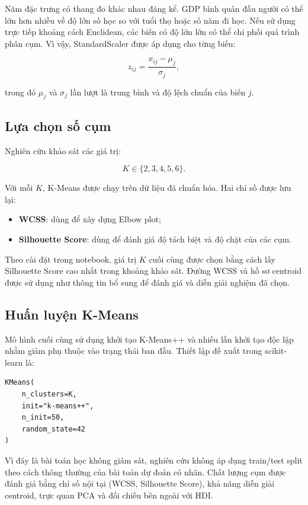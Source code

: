 \documentclass[11pt,a4paper]{article}
\begin{document}
Năm đặc trưng có thang đo khác nhau đáng kể. GDP bình quân đầu người có thể lớn hơn nhiều về độ lớn số học so với tuổi thọ hoặc số năm đi học. Nếu sử dụng trực tiếp khoảng cách Euclidean, các biến có độ lớn lớn có thể chi phối quá trình phân cụm. Vì vậy, StandardScaler được áp dụng cho từng biến:

\begin{equation}
z_{ij} = \frac{x_{ij}-\mu_j}{\sigma_j},
\label{eq:zscore}
\end{equation}

trong đó $\mu_j$ và $\sigma_j$ lần lượt là trung bình và độ lệch chuẩn của biến $j$.

\subsection{Lựa chọn số cụm}

Nghiên cứu khảo sát các giá trị:

\begin{equation}
K \in \{2,3,4,5,6\}.
\end{equation}

Với mỗi $K$, K-Means được chạy trên dữ liệu đã chuẩn hóa. Hai chỉ số được lưu lại:

\begin{itemize}
    \item \textbf{WCSS}: dùng để xây dựng Elbow plot;
    \item \textbf{Silhouette Score}: dùng để đánh giá độ tách biệt và độ chặt của các cụm.
\end{itemize}

Theo cài đặt trong notebook, giá trị $K$ cuối cùng được chọn bằng cách lấy Silhouette Score cao nhất trong khoảng khảo sát. Đường WCSS và hồ sơ centroid được sử dụng như thông tin bổ sung để đánh giá và diễn giải nghiệm đã chọn.

\subsection{Huấn luyện K-Means}

Mô hình cuối cùng sử dụng khởi tạo K-Means++ và nhiều lần khởi tạo độc lập nhằm giảm phụ thuộc vào trạng thái ban đầu. Thiết lập đề xuất trong scikit-learn là:

\begin{verbatim}
KMeans(
    n_clusters=K,
    init="k-means++",
    n_init=50,
    random_state=42
)
\end{verbatim}

Vì đây là bài toán học không giám sát, nghiên cứu không áp dụng train/test split theo cách thông thường của bài toán dự đoán có nhãn. Chất lượng cụm được đánh giá bằng chỉ số nội tại (WCSS, Silhouette Score), khả năng diễn giải centroid, trực quan PCA và đối chiếu bên ngoài với HDI.
\end{document}
